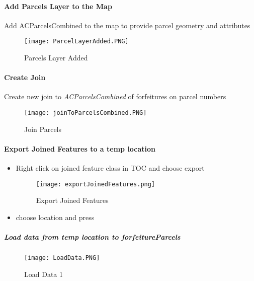  \paragraph{Add Parcels Layer to the Map}
 \vspace{.3in}

 Add ACParcelsCombined to the map to provide parcel geometry and attributes
 \vspace{.25in}

 \begin{figure}[h!]
 \centering
     \texttt{[image: ParcelLayerAdded.PNG]}
 \caption{Parcels Layer Added}
 \end{figure}
 \clearpage
 \paragraph{Create Join}
 \vspace{.3in}

 Create new join to \emph{ACParcelsCombined} of forfeitures on parcel numbers
 \vspace{.25in}

 \begin{figure}[h!]
 \centering
     \texttt{[image: joinToParcelsCombined.PNG]}
 \caption{Join Parcels}
 \end{figure}
 \clearpage
 \paragraph[Export Joined Features]{Export Joined Features to a temp location \texorpdfstring{\\}{}}
 \begin{itemize}
 \item Right click \rtArrow  on joined feature class in TOC and choose export
 \begin{figure}[h!]
 \centering
     \texttt{[image: exportJoinedFeatures.png]}
 \caption{Export Joined Features}
 \end{figure}
 \item choose location and press 
 \end{itemize}
 \clearpage
 \subparagraph[Load data to forfeitureParcels]{\Large Load data from temp location to forfeitureParcels}
 \subparagraph*{}
 \begin{figure}[h!]
 \centering
     \texttt{[image: LoadData.PNG]}
 \caption{Load Data 1}
 \end{figure}
 \clearpage
